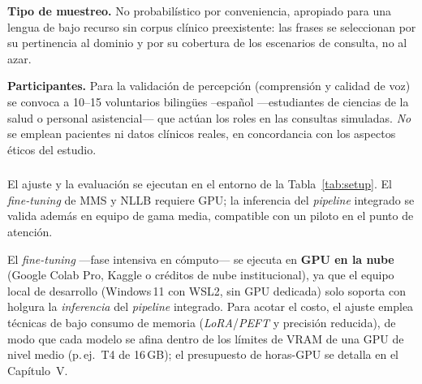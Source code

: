 \begin{bloqueObsDos}
\noindent\textbf{Tipo de muestreo.} No probabil{\'i}stico por conveniencia, apropiado para una lengua
de bajo recurso sin corpus cl{\'i}nico preexistente: las frases se seleccionan por su pertinencia al
dominio y por su cobertura de los escenarios de consulta, no al azar.

\noindent\textbf{Participantes.} Para la validaci{\'o}n de percepci{\'o}n (comprensi{\'o}n y calidad
de voz) se convoca a 10--15 voluntarios biling{\"u}es --espa{\~n}ol ---estudiantes de
ciencias de la salud o personal asistencial--- que act{\'u}an los roles en las consultas simuladas.
\emph{No} se emplean pacientes ni datos cl{\'i}nicos reales, en concordancia con los aspectos
{\'e}ticos del estudio.

\noindent{}
\end{bloqueObsDos}

\subsubsection{}
\begin{bloqueNuevo}
El ajuste y la evaluaci{\'o}n se ejecutan en el entorno de la Tabla~\ref{tab:setup}. El
\emph{fine-tuning} de MMS y NLLB requiere GPU; la inferencia del \emph{pipeline} integrado se valida
adem{\'a}s en equipo de gama media, compatible con un piloto en el punto de atenci{\'o}n.
\end{bloqueNuevo}

\begin{bloqueObsCuatro}
\noindent El \emph{fine-tuning} ---fase intensiva en c{\'o}mputo--- se ejecuta en \textbf{GPU en la
nube} (Google Colab Pro, Kaggle o cr{\'e}ditos de nube institucional), ya que el equipo local de
desarrollo (Windows\,11 con WSL2, sin GPU dedicada) solo soporta con holgura la \emph{inferencia} del
\emph{pipeline} integrado. Para acotar el costo, el ajuste emplea t{\'e}cnicas de bajo consumo de
memoria (\emph{LoRA}/\emph{PEFT} \parencite{hu2021lora} y precisi{\'o}n reducida), de modo que cada modelo se afina dentro de
los l{\'i}mites de VRAM de una GPU de nivel medio (p.\,ej.\ T4 de 16\,GB); el presupuesto de
horas-GPU se detalla en el Cap{\'i}tulo~V.
\end{bloqueObsCuatro}

